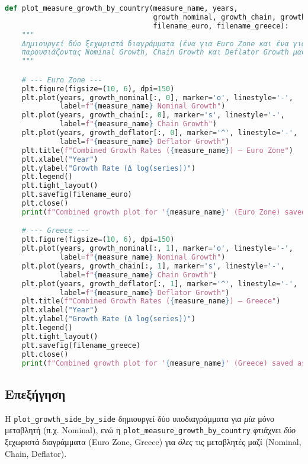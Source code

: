 \documentclass{book}
\begin{document}
\begin{tcolorbox}[colback=white,colframe=black,title=plot\_measure\_growth\_by\_country]
\begin{lstlisting}[language=Python]
def plot_measure_growth_by_country(measure_name, years,
                                   growth_nominal, growth_chain, growth_deflator,
                                   filename_euro, filename_greece):
    """
    Δημιουργεί δύο ξεχωριστά διαγράμματα (ένα για Euro Zone και ένα για Greece),
    παρουσιάζοντας Nominal Growth, Chain Growth και Deflator Growth μαζί.
    """

    # --- Euro Zone ---
    plt.figure(figsize=(10, 6), dpi=150)
    plt.plot(years, growth_nominal[:, 0], marker='o', linestyle='-',
             label=f"{measure_name} Nominal Growth")
    plt.plot(years, growth_chain[:, 0], marker='s', linestyle='-',
             label=f"{measure_name} Chain Growth")
    plt.plot(years, growth_deflator[:, 0], marker='^', linestyle='-',
             label=f"{measure_name} Deflator Growth")
    plt.title(f"Combined Growth Rates ({measure_name}) – Euro Zone")
    plt.xlabel("Year")
    plt.ylabel("Growth Rate (Δ log(series))")
    plt.legend()
    plt.tight_layout()
    plt.savefig(filename_euro)
    plt.close()
    print(f"Combined growth plot for '{measure_name}' (Euro Zone) saved as: {filename_euro}")

    # --- Greece ---
    plt.figure(figsize=(10, 6), dpi=150)
    plt.plot(years, growth_nominal[:, 1], marker='o', linestyle='-',
             label=f"{measure_name} Nominal Growth")
    plt.plot(years, growth_chain[:, 1], marker='s', linestyle='-',
             label=f"{measure_name} Chain Growth")
    plt.plot(years, growth_deflator[:, 1], marker='^', linestyle='-',
             label=f"{measure_name} Deflator Growth")
    plt.title(f"Combined Growth Rates ({measure_name}) – Greece")
    plt.xlabel("Year")
    plt.ylabel("Growth Rate (Δ log(series))")
    plt.legend()
    plt.tight_layout()
    plt.savefig(filename_greece)
    plt.close()
    print(f"Combined growth plot for '{measure_name}' (Greece) saved as: {filename_greece}")
\end{lstlisting}
\end{tcolorbox}

\subsection*{Επεξήγηση}
Η \texttt{plot\_growth\_side\_by\_side} δημιουργεί δύο υποδιαγράμματα για \emph{μία} μόνο μεταβλητή (π.χ. Nominal), ενώ η \texttt{plot\_measure\_growth\_by\_country} φτιάχνει \emph{δύο} ξεχωριστά διαγράμματα (Euro Zone, Greece) για \emph{όλες} τις μεταβλητές μαζί (Nominal, Chain, Deflator).
\end{document}
